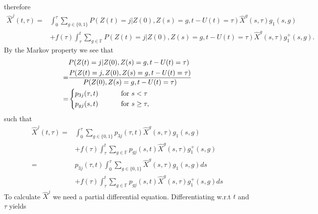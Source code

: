 \documentclass[12pt]{article}
\begin{document}
therefore
\begin{align*}
\hat{X}^j(t,\tau)=& \int_0^{\tau} \sum_{g \in \{ 0, 1\} }  
P(Z(t)=j |Z(0),Z(s)=g, t-U(t)=\tau) \hat{X}^g(s,\tau) g_1(s,g) \\
&+ f(\tau)  \int_{\tau}^t \sum_{g \in \mathbb{F}} 
P(Z(t)=j |Z(0),Z(s)=g, t-U(t)=\tau) \hat{X}^g(s,\tau) g_1^+(s,g).
\end{align*}
By the Markov property we see that
\begin{align*}
& P(Z(t)=j |Z(0),Z(s)=g, t-U(t)=\tau)\\
=
&\frac{P(Z(t)=j,Z(0),Z(s)=g,t-U(t)=\tau)}{P(Z(0),Z(s)=g,t-U(t)=\tau)} 
\\
=&
\begin{dcases}
p_{3j}(\tau,t) \qquad &\text{ for } s < \tau \\
p_{gj}(s,t) &\text{ for } s \geq \tau,
\end{dcases}
\end{align*}
such that
\begin{align*}
\hat{X}^j(t,\tau)=& \int_0^{\tau} \sum_{g \in \{0, 1\} }  
p_{3j}(\tau,t) \hat{X}^g(s,\tau) g_1(s,g) \\
&+ f(\tau)  \int_{\tau}^t \sum_{g \in \mathbb{F}} 
p_{gj}(s,t) \hat{X}^g(s,\tau) g_1^+(s,g)
\\
=&
p_{3j}(\tau,t) 
\int_0^{\tau} \sum_{g \in \{0 , 1\}}   \hat{X}^g(s,\tau) g_1(s,g) ds \\
&+ f(\tau)  \int_{\tau}^t \sum_{g \in \mathbb{F}} 
p_{gj}(s,t) \hat{X}^g(s,\tau) g_1^+(s,g) ds
\end{align*}
To calculate $\hat{X}^j$ we need a partial differential equation. Differentiating w.r.t $t$ and $\tau$ yields
\end{document}
